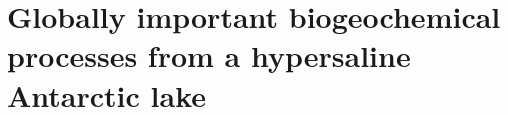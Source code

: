 \chapter[Organic Lake]{Globally important biogeochemical processes from a hypersaline Antarctic lake}
\label{ch:org}
